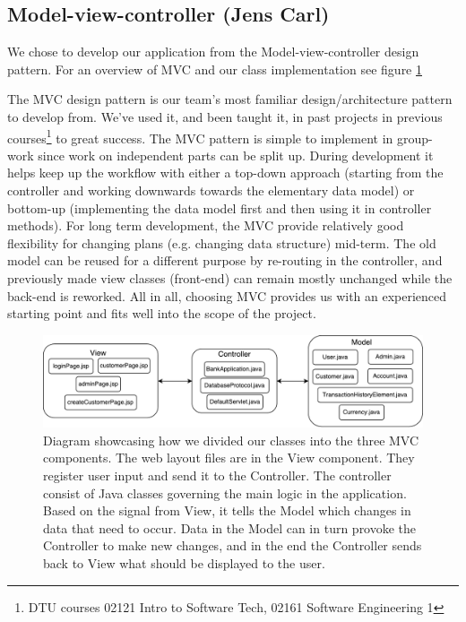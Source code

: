 \subsection{Model-view-controller (Jens Carl)}
We chose to develop our application from the Model-view-controller design pattern. For an overview of MVC and our class implementation see figure \ref{fig:MVC_CD}

The MVC design pattern is our team's most familiar design/architecture pattern to develop from. We've used it, and been taught it, in past projects in previous courses\footnote{DTU courses 02121 Intro to Software Tech, 02161 Software Engineering 1} to great success. The MVC pattern is simple to implement in group-work since work on independent parts can be split up. During development it helps keep up the workflow with either a top-down approach (starting from the controller and working downwards towards the elementary data model) or bottom-up (implementing the data model first and then using it in controller methods). For long term development, the MVC provide relatively good flexibility for changing plans (e.g. changing data structure) mid-term. The old model can be reused for a different purpose by re-routing in the controller, and previously made view classes (front-end) can remain mostly unchanged while the back-end is reworked.  
All in all, choosing MVC provides us with an experienced starting point and fits well into the scope of the project.

\begin{figure}[H]
\centering
\includegraphics[width = 1.00\textwidth]{figures/class_diagram_abridged.pdf}
\caption{Diagram showcasing how we divided our classes into the three MVC components. The web layout files are in the View component. They register user input and send it to the Controller. The controller consist of Java classes governing the main logic in the application. Based on the signal from View, it tells the Model which changes in data that need to occur. Data in the Model can in turn provoke the Controller to make new changes, and in the end the Controller sends back to View what should be displayed to the user.}
\label{fig:MVC_CD}
\end{figure}